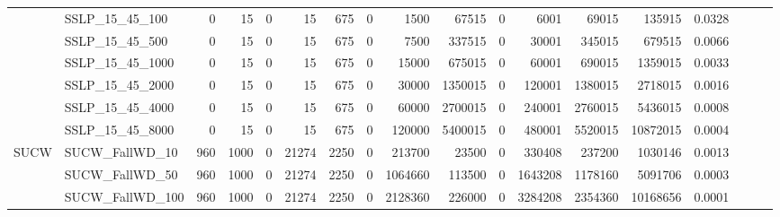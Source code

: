 \begin{table}[h]
{\begin{tabular}{llrrrrrrrrrrrrrlll}
			& SSLP\_15\_45\_100            & 0            & 15          & 0          & 15           & 675         & 0          & 1500    & 67515    & 0      & 6001    & 69015    & 135915     & 0.0328    &                          &                          &                          \\
			& SSLP\_15\_45\_500            & 0            & 15          & 0          & 15           & 675         & 0          & 7500    & 337515   & 0      & 30001   & 345015   & 679515     & 0.0066    &                          &                          &                          \\
			& SSLP\_15\_45\_1000           & 0            & 15          & 0          & 15           & 675         & 0          & 15000   & 675015   & 0      & 60001   & 690015   & 1359015    & 0.0033    &                          &                          &                          \\
			& SSLP\_15\_45\_2000           & 0            & 15          & 0          & 15           & 675         & 0          & 30000   & 1350015  & 0      & 120001  & 1380015  & 2718015    & 0.0016    &                          &                          &                          \\
			& SSLP\_15\_45\_4000           & 0            & 15          & 0          & 15           & 675         & 0          & 60000   & 2700015  & 0      & 240001  & 2760015  & 5436015    & 0.0008    &                          &                          &                          \\
			& SSLP\_15\_45\_8000           & 0            & 15          & 0          & 15           & 675         & 0          & 120000  & 5400015  & 0      & 480001  & 5520015  & 10872015   & 0.0004    &                          &                          &                          \\ \hline
			\multirow{24}{*}{SUCW}      & SUCW\_FallWD\_10             & 960          & 1000        & 0          & 21274        & 2250        & 0          & 213700  & 23500    & 0      & 330408  & 237200   & 1030146    & 0.0013    &                          &                          &                          \\
			& SUCW\_FallWD\_50             & 960          & 1000        & 0          & 21274        & 2250        & 0          & 1064660 & 113500   & 0      & 1643208 & 1178160  & 5091706    & 0.0003    &                          &                          &                          \\
			& SUCW\_FallWD\_100            & 960          & 1000        & 0          & 21274        & 2250        & 0          & 2128360 & 226000   & 0      & 3284208 & 2354360  & 10168656   & 0.0001    &                          &                          &                          \\

\end{tabular}}
\end{table}

